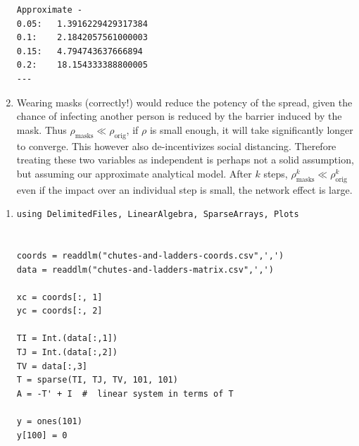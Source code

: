 \documentclass[]{exam}
\begin{document}
\begin{questions}
\begin{enumerate}[label=\arabic*.]
\begin{verbatim}
Approximate -
0.05:	1.3916229429317384
0.1:	2.1842057561000003
0.15:	4.794743637666894
0.2:	18.154333388800005
---
		\end{verbatim}
	\item Wearing masks (correctly!) would reduce the potency of the spread, given the chance of infecting another person is reduced by the barrier induced by the mask. Thus $\rho_{\mathrm{masks}} \ll \rho_{\mathrm{orig}}$, if $\rho$ is small enough, it will take significantly longer to converge. This however also de-incentivizes social distancing. Therefore treating these two variables as independent is perhaps not a solid assumption, but assuming our approximate analytical model. After $k$ steps, $\rho_{\mathrm{masks}}^k \ll \rho_{\mathrm{orig}}^k$ even if the impact over an individual step is small, the network effect is large.

\end{enumerate}

\newpage
\question
\hfill

\begin{enumerate}[label=\arabic*.]
	\item
		\begin{lstlisting}
using DelimitedFiles, LinearAlgebra, SparseArrays, Plots


coords = readdlm("chutes-and-ladders-coords.csv",',')
data = readdlm("chutes-and-ladders-matrix.csv",',')

xc = coords[:, 1]
yc = coords[:, 2]

TI = Int.(data[:,1])
TJ = Int.(data[:,2])
TV = data[:,3]
T = sparse(TI, TJ, TV, 101, 101)
A = -T' + I  #  linear system in terms of T

y = ones(101)
y[100] = 0


\end{lstlisting}
\end{enumerate}
\end{questions}
\end{document}
